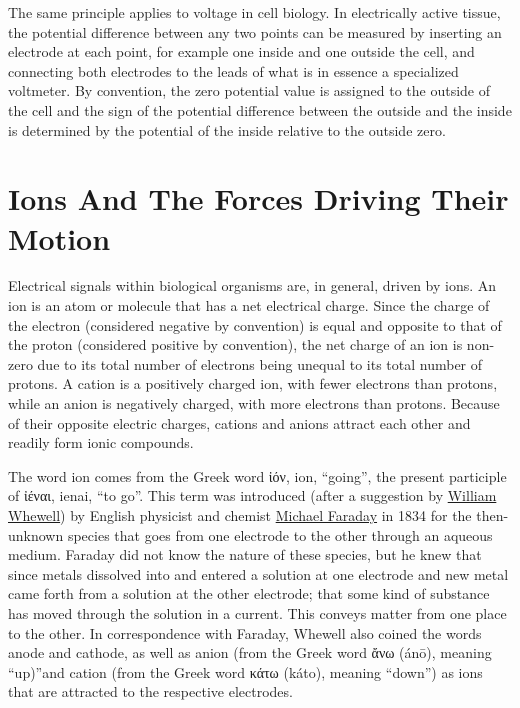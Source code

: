 The same principle applies to voltage in cell biology. In electrically active tissue, the potential difference between any two points can be measured by inserting an electrode at each point, for example one inside and one outside the cell, and connecting both electrodes to the leads of what is in essence a specialized voltmeter. By convention, the zero potential value is assigned to the outside of the cell and the sign of the potential difference between the outside and the inside is determined by the potential of the inside relative to the outside zero.

\hypertarget{ions-and-the-forces-driving-their-motion}{%
\section{Ions And The Forces Driving Their Motion}\label{ions-and-the-forces-driving-their-motion}}

Electrical signals within biological organisms are, in general, driven by ions. An ion is an atom or molecule that has a net electrical charge. Since the charge of the electron (considered negative by convention) is equal and opposite to that of the proton (considered positive by convention), the net charge of an ion is non-zero due to its total number of electrons being unequal to its total number of protons. A cation is a positively charged ion, with fewer electrons than protons, while an anion is negatively charged, with more electrons than protons. Because of their opposite electric charges, cations and anions attract each other and readily form ionic compounds.

The word ion comes from the Greek word ἰόν, ion, ``going'', the present participle of ἰέναι, ienai, ``to go''. This term was introduced (after a suggestion by \href{https://en.wikipedia.org/wiki/William_Whewell}{William Whewell}) by English physicist and chemist \href{https://en.wikipedia.org/wiki/Michael_Faraday}{Michael Faraday} in 1834 for the then-unknown species that goes from one electrode to the other through an aqueous medium. Faraday did not know the nature of these species, but he knew that since metals dissolved into and entered a solution at one electrode and new metal came forth from a solution at the other electrode; that some kind of substance has moved through the solution in a current. This conveys matter from one place to the other. In correspondence with Faraday, Whewell also coined the words anode and cathode, as well as anion (from the Greek word ἄνω (ánō), meaning ``up)''and cation (from the Greek word κάτω (káto), meaning ``down'') as ions that are attracted to the respective electrodes.

